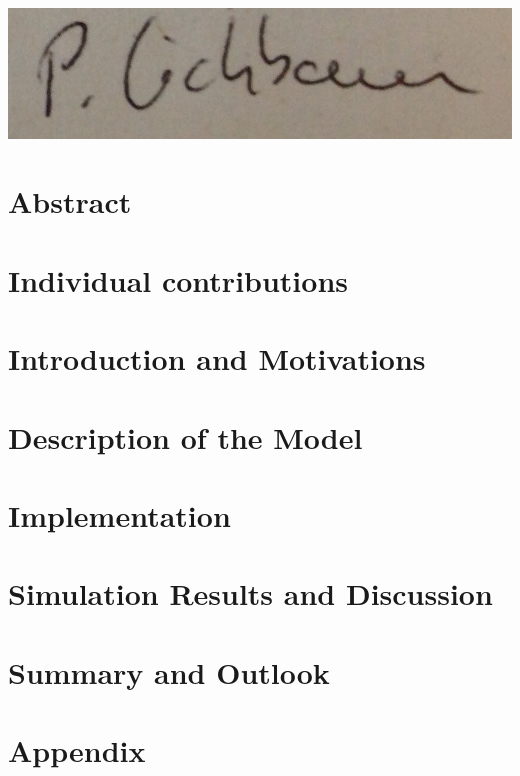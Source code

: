 \documentclass[11pt]{article}
\begin{document}
\begin{minipage}{0.33\textwidth}
\includegraphics[scale=0.13]{patrick.png}
\end{minipage}

\clearpage

\tableofcontents

\newpage




\section{Abstract}

\section{Individual contributions}

\section{Introduction and Motivations}



\section{Description of the Model}




\section{Implementation}







\section{Simulation Results and Discussion}



\section{Summary and Outlook}



\section{Appendix}



\end{document}
